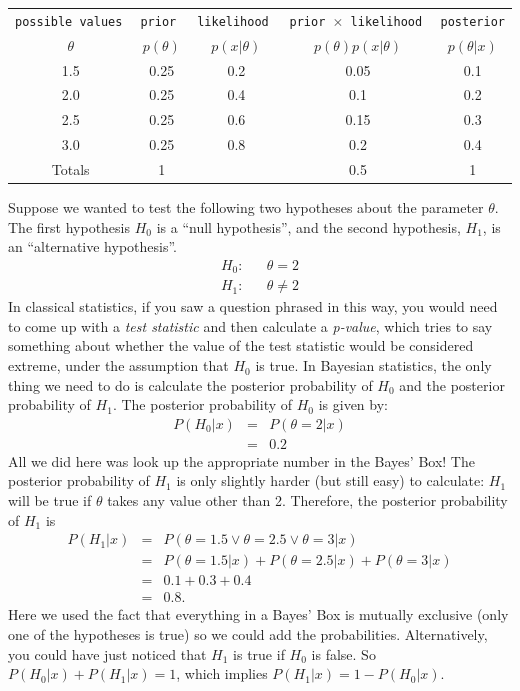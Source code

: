 \begin{table}[!ht]
\begin{center}
\begin{tabular}{|c|c|c|c|c|}
\hline
\tt{possible values} & \tt{prior} & \tt{likelihood} & \tt{prior} $\times$ \tt{likelihood} & \tt{posterior}\\
$\theta$ & $p(\theta)$ & $p(x|\theta)$ & $p(\theta)p(x|\theta)$ & $p(\theta|x)$\\
\hline
1.5 & 0.25 & 0.2 & 0.05 & 0.1\\
2.0 & 0.25 & 0.4 & 0.1 & 0.2\\
2.5 & 0.25 & 0.6 & 0.15 & 0.3\\
3.0 & 0.25 & 0.8 & 0.2 & 0.4\\
\hline
Totals & 1 & & 0.5 & 1\\
\hline
\end{tabular}
\end{center}
\end{table}
Suppose we wanted to test the following two hypotheses about the parameter $\theta$.
The first hypothesis $H_0$ is a ``null hypothesis'', and the second hypothesis,
$H_1$, is an ``alternative hypothesis''.
\begin{eqnarray}
H_0: && \theta = 2\\
H_1: && \theta \neq 2
\end{eqnarray}
In classical statistics, if you saw a question phrased in this way, you would
need to come up with a {\it test statistic}
and then calculate a {\it p-value}, which tries to say something about whether
the value of the test statistic would be considered extreme, under the
assumption that $H_0$ is true.
In Bayesian statistics, the only thing we need to do is calculate
the posterior probability of $H_0$ and the posterior probability of $H_1$.
The posterior probability of $H_0$ is given by:
\begin{eqnarray}
P(H_0|x) &=& P(\theta = 2|x)\\
&=& 0.2
\end{eqnarray}
All we did here was look up the appropriate number in the Bayes' Box! The
posterior probability of $H_1$ is only slightly harder (but still easy)
to calculate: $H_1$ will
be true if $\theta$ takes any value other than 2. Therefore, the posterior
probability of $H_1$ is
\begin{eqnarray}
P(H_1|x) &=& P(\theta = 1.5 \vee \theta = 2.5 \vee \theta = 3|x)\\
&=& P(\theta = 1.5|x) + P(\theta = 2.5|x) + P(\theta = 3|x)\\
&=& 0.1 + 0.3 + 0.4\\
&=& 0.8.
\end{eqnarray}
Here we used the fact that everything in a Bayes' Box is mutually exclusive
(only one of the hypotheses is true) so we could add the probabilities.
Alternatively, you could have just noticed that $H_1$ is true if $H_0$ is false.
So $P(H_0|x) + P(H_1|x) = 1$, which implies $P(H_1|x) = 1 - P(H_0|x)$.

